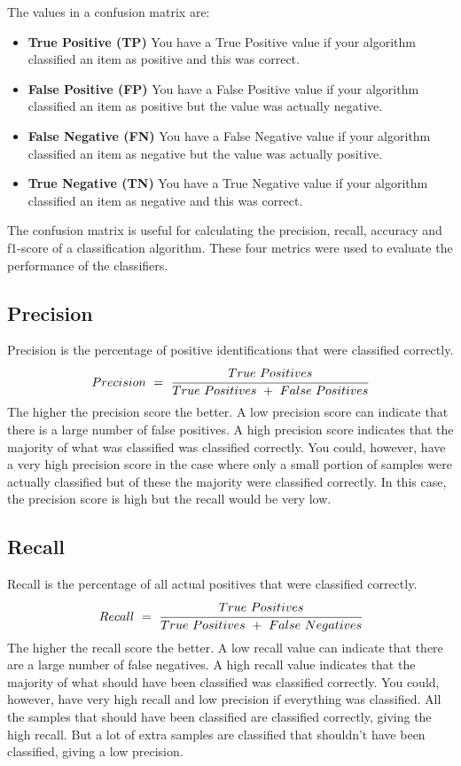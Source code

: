 The values in a confusion matrix are:
\begin{itemize}
    \item \textbf{True Positive (TP)}\newline
    You have a True Positive value if your algorithm classified an item as positive and this was correct.
    \item \textbf{False Positive (FP)}\newline
    You have a False Positive value if your algorithm classified an item as positive but the value was actually negative.
    \item \textbf{False Negative (FN)}\newline
    You have a False Negative value if your algorithm classified an item as negative but the value was actually positive.
    \item \textbf{True Negative (TN)}\newline
    You have a True Negative value if your algorithm classified an item as negative and this was correct.
\end{itemize}

The confusion matrix is useful for calculating the precision, recall, accuracy and f1-score of a classification algorithm. These four metrics were used to evaluate the performance of the classifiers.

\subsection{Precision}
Precision is the percentage of positive identifications that were classified correctly.
\begin{equation}
    Precision\ =\ \cfrac{True\ Positives}{True\ Positives\ +\ False\ Positives}
\end{equation}
The higher the precision score the better. A low precision score can indicate that there is a large number of false positives. A high precision score indicates that the majority of what was classified was classified correctly. You could, however, have a very high precision score in the case where only a small portion of samples were actually classified but of these the majority were classified correctly. In this case, the precision score is high but the recall would be very low.

\subsection{Recall}
Recall is the percentage of all actual positives that were classified correctly.
\begin{equation}
    Recall\ =\ \cfrac{True\ Positives}{True\ Positives\ +\ False\ Negatives}
\end{equation}
The higher the recall score the better. A low recall value can indicate that there are a large number of false negatives. A high recall value indicates that the majority of what should have been classified was classified correctly. You could, however, have very high recall and low precision if everything was classified. All the samples that should have been classified are classified correctly, giving the high recall. But a lot of extra samples are classified that shouldn't have been classified, giving a low precision.

